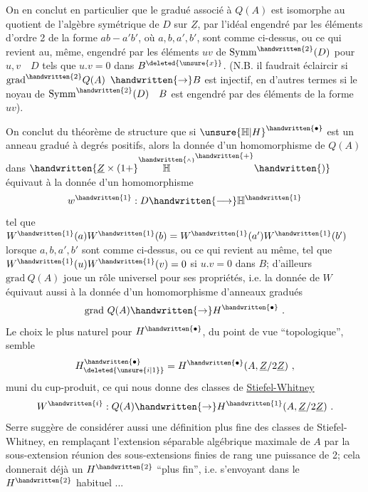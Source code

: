 On en conclut en particulier que le gradué associé à $Q(A)$ est isomorphe au quotient de l'algèbre symétrique de $D$ sur $\underline{Z}$, par  l'idéal engendré par les éléments d'ordre 2 de la forme $ab-a'b'$, où $a,b,a',b'$, sont comme ci-dessus, ou ce qui revient au, même, engendré par les éléments $uv$ de $\mathrm{Symm}^{\handwritten{2}}(D)$ pour $u,v\quad D$ tels que $u.v=0$ dans $B^{\deleted{\unsure{x}}}$. (N.B. il faudrait éclaircir si $\mathrm{grad}^{\handwritten{2}}Q(A)$  $\handwritten{\to}B$ est  injectif, en d'autres termes si le noyau de $\mathrm{Symm}^{\handwritten{2}}(D)\quad B$ est engendré par des éléments de la forme  $uv$).

On conclut du  théorème de structure que si ${\unsure{\mathbb{H}|H}}^{\handwritten{\bullet}}$ est un anneau gradué à degrés positifs, alors la donnée d'un homomorphisme  de $Q(A)$ dans $\handwritten{\underline{Z}\times(1+}\overset{\handwritten{\scriptscriptstyle\wedge}}{\mathbb{H}}^{\handwritten{+}}\handwritten{)}$ équivaut à la donnée d'un homomorphisme
\[
w^{\handwritten{1}}:D\handwritten{\longrightarrow}\mathbb{H}^{\handwritten{1}}
\]
tel que $W^{\handwritten{1}}(a)W^{\handwritten{1}}(b)=W^{\handwritten{1}}(a')W^{\handwritten{1}}(b')$ lorsque $a,b,a',b'$ sont comme ci-dessus, ou ce qui revient au même, tel que $W^{\handwritten{1}}(u)W^{\handwritten{1}}(v)=0$ si $u.v=0$ dans $B$;  d'ailleurs $\mathrm{grad}\ Q(A)$ joue un rôle universel pour ses propriétés, i.e. la donnée de $W$ équivaut aussi à la donnée d'un homomorphisme  d'anneaux gradués
\[
\mathrm{grad}\ Q(A)\handwritten{\to}H^{\handwritten{\bullet}}\ .
\]
Le choix le plus naturel pour $H^{\handwritten{\bullet}}$, du point de vue ``topologique'', semble
\[
H_{\deleted{\unsure{i|1}}}^{\handwritten{\bullet}}=H^{\handwritten{\bullet}}(A,\underline{Z}/2\underline{Z})\ ,
\]
muni du cup-produit, ce qui nous donne des classes de \uline{Stiefel-Whitney}
\[
W^{\handwritten{i}}:Q(A)\handwritten{\to}H^{\handwritten{1}}(A,\underline{Z}/2\underline{Z})\ .
\]
Serre suggère de  considérer aussi une définition plus fine des classes de Stiefel-Whitney, en remplaçant  l'extension séparable algébrique maximale de $A$ par la sous-extension réunion des sous-extensions finies de rang une puissance de 2; cela donnerait déjà un $H^{\handwritten{2}}$ ``plus fin'', i.e. s'envoyant dans le $H^{\handwritten{2}}$ habituel ...

